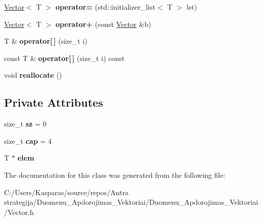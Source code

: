 \begin{DoxyCompactItemize}
\item 
\mbox{\label{class_vector_a967c6111982c4e7132d2d063dc63f849}} 
\mbox{\hyperlink{class_vector}{Vector}}$<$ T $>$ {\bfseries operator=} (std\+::initializer\+\_\+list$<$ T $>$ lst)
\item 
\mbox{\label{class_vector_a2429d62203606112a112a390cfefa732}} 
\mbox{\hyperlink{class_vector}{Vector}}$<$ T $>$ {\bfseries operator+} (const \mbox{\hyperlink{class_vector}{Vector}} \&b)
\item 
\mbox{\label{class_vector_a620f40593577792b4fa9546da39eb9da}} 
T \& {\bfseries operator\mbox{[}$\,$\mbox{]}} (size\+\_\+t i)
\item 
\mbox{\label{class_vector_ac67f5e22236ad36ff9db3a4580606ac9}} 
const T \& {\bfseries operator\mbox{[}$\,$\mbox{]}} (size\+\_\+t i) const
\item 
\mbox{\label{class_vector_adc4d93383895f3f88fad1fcc256c765e}} 
void {\bfseries reallocate} ()
\end{DoxyCompactItemize}
\subsection*{Private Attributes}
\begin{DoxyCompactItemize}
\item 
\mbox{\label{class_vector_a0fd3434801c6378fdb12167bbfc61614}} 
size\+\_\+t {\bfseries sz} = 0
\item 
\mbox{\label{class_vector_a97ce6d975ed9e9ee81592b0778bee266}} 
size\+\_\+t {\bfseries cap} = 4
\item 
\mbox{\label{class_vector_afce0f84380ff2c719e955fd3baa2b4fe}} 
T $\ast$ {\bfseries elem}
\end{DoxyCompactItemize}


The documentation for this class was generated from the following file\+:\begin{DoxyCompactItemize}
\item 
C\+:/\+Users/\+Kasparas/source/repos/\+Antra strategija/\+Duomenu\+\_\+\+Apdorojimas\+\_\+\+Vektoriai/\+Duomenu\+\_\+\+Apdorojimas\+\_\+\+Vektoriai/Vector.\+h\end{DoxyCompactItemize}
